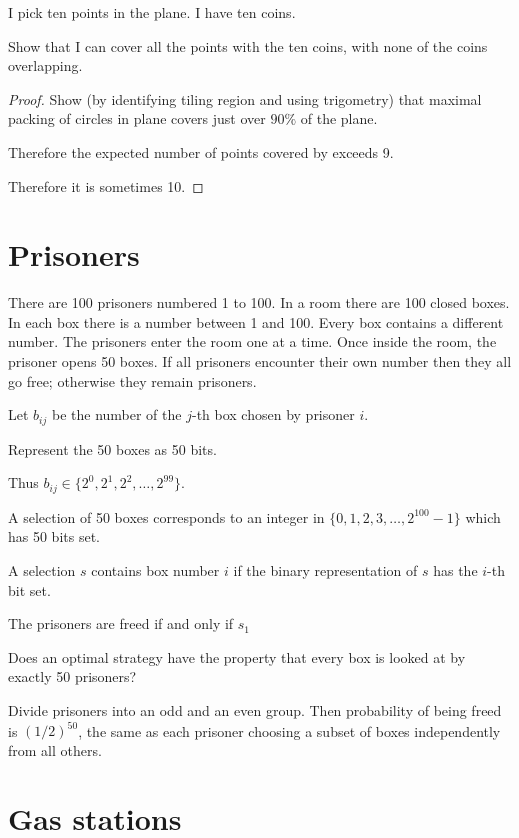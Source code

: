 \documentclass[12pt]{article}
\begin{document}
\newpage
\begin{mdframed}
   I pick ten points in the plane. I have ten coins.

   Show that I can cover all the points with the ten coins, with none of the coins overlapping.
\end{mdframed}

\begin{proof}
  Show (by identifying tiling region and using trigometry) that maximal packing of circles in plane
  covers just over $90\%$ of the plane.

  Therefore the expected number of points covered by exceeds 9.

  Therefore it is sometimes 10.
\end{proof}

\newpage
\section{Prisoners}
\begin{mdframed}
  There are 100 prisoners numbered 1 to 100. In a room there are 100 closed boxes. In each box
  there is a number between 1 and 100. Every box contains a different number. The prisoners enter
  the room one at a time. Once inside the room, the prisoner opens 50 boxes. If all prisoners
  encounter their own number then they all go free; otherwise they remain prisoners.
\end{mdframed}

Let $b_{ij}$ be the number of the $j$-th box chosen by prisoner $i$.

Represent the 50 boxes as 50 bits.

Thus $b_{ij} \in \{2^0, 2^1, 2^2, \ldots, 2^{99}\}$.

A selection of 50 boxes corresponds to an integer in $\{0, 1, 2, 3, \ldots, 2^{100} - 1\}$ which
has 50 bits set.

A selection $s$ contains box number $i$ if the binary representation of $s$ has the $i$-th bit set.

The prisoners are freed if and only if $s_1$

Does an optimal strategy have the property that every box is looked at by exactly 50 prisoners?

Divide prisoners into an odd and an even group. Then probability of being freed is $(1/2)^{50}$,
the same as each prisoner choosing a subset of boxes independently from all others.

\newpage
\section{Gas stations}
\end{document}
